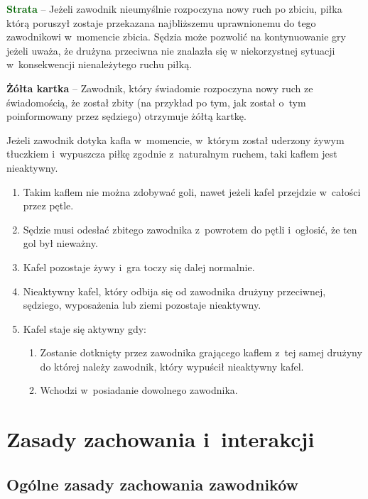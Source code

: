 \documentclass[12pt,a4paper]{article}
\renewcommand{\paragraph}[1]{
  \oldparagraph{#1}%
  \leftskip2cm
}
\newcommand\yellowcard[1]{\bgroup\textcolor{darkyellow}{\textbf{#1}}}
\newcommand\other[1]{\bgroup\textcolor{darkgreen}{\textbf{#1}}}
\begin{document}
\other{Strata} -- Jeżeli zawodnik nieumyślnie rozpoczyna nowy ruch po
zbiciu, piłka którą poruszył zostaje przekazana najbliższemu
uprawnionemu do tego zawodnikowi w~momencie zbicia. Sędzia może pozwolić
na kontynuowanie gry jeżeli uważa, że drużyna przeciwna nie znalazła się
w niekorzystnej sytuacji w~konsekwencji nienależytego ruchu piłką.

\yellowcard{Żółta kartka} -- Zawodnik, który świadomie rozpoczyna nowy ruch ze
świadomością, że został zbity (na przykład po tym, jak został o~tym
poinformowany przez sędziego) otrzymuje żółtą kartkę.

\paragraph{Nieaktywny kafel}
Jeżeli zawodnik dotyka kafla w~momencie, w~którym został uderzony żywym tłuczkiem i~wypuszcza piłkę
zgodnie z~naturalnym ruchem, taki kaflem jest nieaktywny.

\begin{enumerate}
	\item
	      Takim kaflem nie można zdobywać goli, nawet jeżeli kafel przejdzie w~całości przez pętle.
	\item
	      Sędzie musi odesłać zbitego zawodnika z~powrotem do pętli i~ogłosić,
	      że ten gol był nieważny.
	\item
	      Kafel pozostaje żywy i~gra toczy się dalej normalnie.
	\item
	      Nieaktywny kafel, który odbija się od zawodnika drużyny przeciwnej,
	      sędziego, wyposażenia lub ziemi pozostaje nieaktywny.
	\item
	      Kafel staje się aktywny gdy:

	      \begin{enumerate}
		      \item
		            Zostanie dotknięty przez zawodnika grającego kaflem z~tej samej
		            drużyny do której należy zawodnik, który wypuścił nieaktywny kafel.
		      \item
		            Wchodzi w~posiadanie dowolnego zawodnika.
	      \end{enumerate}
\end{enumerate}

\pagebreak
\section{Zasady zachowania i~interakcji}

\subsection{Ogólne zasady zachowania zawodników}
\end{document}
